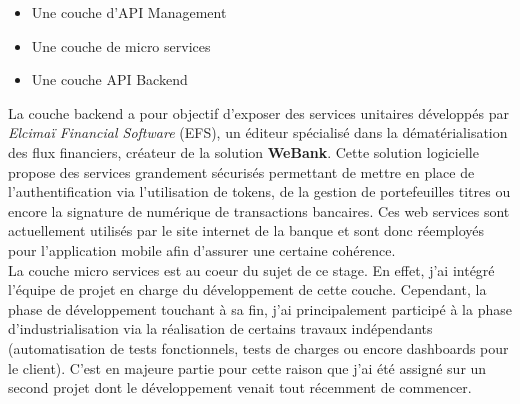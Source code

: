 \begin{itemize}
	\item Une couche d'API Management
	\item Une couche de micro services
	\item Une couche API Backend \\
\end{itemize} 

	La couche backend a pour objectif d'exposer des services unitaires développés par \textit{Elcimaï Financial Software} (EFS), un éditeur spécialisé dans la dématérialisation des flux financiers, créateur de la solution \textbf{WeBank}. Cette solution logicielle propose des services grandement sécurisés permettant de mettre en place de l'authentification via l'utilisation de tokens, de la gestion de portefeuilles titres ou encore la signature de numérique de transactions bancaires. Ces web services sont actuellement utilisés par le site internet de la banque et sont donc réemployés pour l'application mobile afin d'assurer une certaine cohérence. \\

	La couche micro services est au coeur du sujet de ce stage. En effet, j'ai intégré l'équipe de projet en charge du développement de cette couche. Cependant, la phase de développement touchant à sa fin, j'ai principalement participé à la phase d'industrialisation via la réalisation de certains travaux indépendants (automatisation de tests fonctionnels, tests de charges ou encore dashboards pour le client). C'est en majeure partie pour cette raison que j'ai été assigné sur un second projet dont le développement venait tout récemment de commencer.